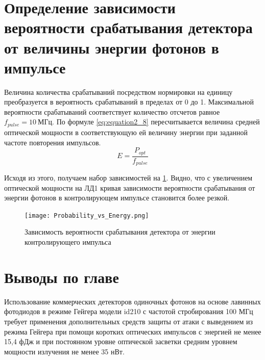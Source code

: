 





\section{Определение зависимости вероятности срабатывания детектора от величины энергии фотонов в импульсе} \label{sec:ch2/sec8}
Величина количества срабатываний посредством нормировки на единицу преобразуется в вероятность срабатываний в пределах от 0 до 1. Максимальной вероятности срабатываний соответствует количество отсчетов равное $f_{pulse} = 10~МГц$. По формуле \ref{eq:equation2_8} пересчитывается величина средней оптической мощности в соответствующую ей величину энергии при заданной частоте повторения импульсов.  
\begin{equation}
 \label{eq:equation2_8}
	E = \frac{P_{opt}}{f_{pulse}}
\end{equation}
 
 Исходя из этого, получаем набор зависимостей на \ref{fig:Probability_vs_Energy}. Видно, что с увеличением оптической мощности на ЛД1 кривая зависимости вероятности срабатывания от энергии фотонов в контролирующем импульсе становится более резкой.  
 
 \begin{figure}[ht]
  \centering
  \texttt{[image: Probability\_vs\_Energy.png]}
  \caption{Зависимость вероятности срабатывания детектора от энергии контролирующего импульса}
  \label{fig:Probability_vs_Energy}
\end{figure}


\pagebreak
\section{Выводы по главе} \label{ch:ch2/sect12}

Использование коммерческих детекторов одиночных фотонов на основе лавинных фотодиодов в режиме Гейгера модели id210 с частотой стробирования 100 МГц  требует применения дополнительных средств защиты от атаки с выведением из режима Гейгера при помощи коротких оптических импульсов с энергией не менее 15,4 фДж и при постоянном уровне оптической засветки средним уровнем мощности излучения не менее 35 нВт.  

